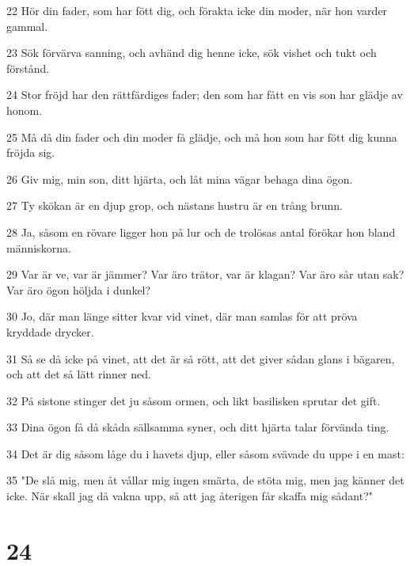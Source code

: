 \par 22 Hör din fader, som har fött dig, och förakta icke din moder, när hon varder gammal.
\par 23 Sök förvärva sanning, och avhänd dig henne icke, sök vishet och tukt och förstånd.
\par 24 Stor fröjd har den rättfärdiges fader; den som har fått en vis son har glädje av honom.
\par 25 Må då din fader och din moder få glädje, och må hon som har fött dig kunna fröjda sig.
\par 26 Giv mig, min son, ditt hjärta, och låt mina vägar behaga dina ögon.
\par 27 Ty skökan är en djup grop, och nästans hustru är en trång brunn.
\par 28 Ja, såsom en rövare ligger hon på lur och de trolösas antal förökar hon bland människorna.
\par 29 Var är ve, var är jämmer? Var äro trätor, var är klagan? Var äro sår utan sak? Var äro ögon höljda i dunkel?
\par 30 Jo, där man länge sitter kvar vid vinet, där man samlas för att pröva kryddade drycker.
\par 31 Så se då icke på vinet, att det är så rött, att det giver sådan glans i bägaren, och att det så lätt rinner ned.
\par 32 På sistone stinger det ju såsom ormen, och likt basilisken sprutar det gift.
\par 33 Dina ögon få då skåda sällsamma syner, och ditt hjärta talar förvända ting.
\par 34 Det är dig såsom låge du i havets djup, eller såsom svävade du uppe i en mast:
\par 35 "De slå mig, men åt vållar mig ingen smärta, de stöta mig, men jag känner det icke. När skall jag då vakna upp, så att jag återigen får skaffa mig sådant?"

\chapter{24}

